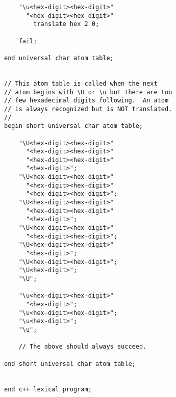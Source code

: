 \documentclass[12pt]{article}
\newenvironment{indpar}[1][0.3in]%
	{\begin{list}{}%
		     {\setlength{\itemsep}{0in}%
		      \setlength{\topsep}{0in}%
		      \setlength{\parsep}{1ex}%
		      \setlength{\labelwidth}{#1}%
		      \setlength{\leftmargin}{#1}%
		      \addtolength{\leftmargin}{\labelsep}}%
	 \item}%
	{\end{list}}
\begin{document}
\begin{indpar}
\begin{verbatim}
    "\u<hex-digit><hex-digit>"
      "<hex-digit><hex-digit>"
        translate hex 2 0;

    fail;

end universal char atom table;


// This atom table is called when the next
// atom begins with \U or \u but there are too
// few hexadecimal digits following.  An atom
// is always recognized but is NOT translated.
//
begin short universal char atom table;

    "\U<hex-digit><hex-digit>"
      "<hex-digit><hex-digit>"
      "<hex-digit><hex-digit>"
      "<hex-digit>";
    "\U<hex-digit><hex-digit>"
      "<hex-digit><hex-digit>"
      "<hex-digit><hex-digit>";
    "\U<hex-digit><hex-digit>"
      "<hex-digit><hex-digit>"
      "<hex-digit>";
    "\U<hex-digit><hex-digit>"
      "<hex-digit><hex-digit>";
    "\U<hex-digit><hex-digit>"
      "<hex-digit>";
    "\U<hex-digit><hex-digit>";
    "\U<hex-digit>";
    "\U";

    "\u<hex-digit><hex-digit>"
      "<hex-digit>";
    "\u<hex-digit><hex-digit>";
    "\u<hex-digit>";
    "\u";

    // The above should always succeed.

end short universal char atom table;


end c++ lexical program;

\end{verbatim}\end{indpar}





\printindex
\end{document}
